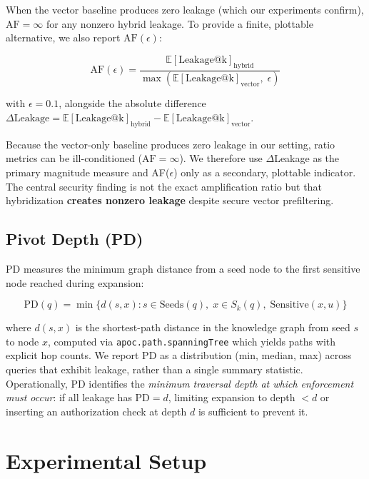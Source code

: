 \documentclass[letterpaper,twocolumn,10pt]{article}
\begin{document}
\noindent When the vector baseline produces zero leakage (which our
experiments confirm), $\text{AF} = \infty$ for any nonzero hybrid
leakage. To provide a finite, plottable alternative, we also report
$\text{AF}(\epsilon)$:

\begin{equation}
\text{AF}(\epsilon) = \frac{\mathbb{E}[\text{Leakage@k}]_{\text{hybrid}}}%
  {\max(\mathbb{E}[\text{Leakage@k}]_{\text{vector}},\; \epsilon)}
\label{eq:af_eps}
\end{equation}

\noindent with $\epsilon = 0.1$, alongside the absolute difference
$\Delta\text{Leakage} = \mathbb{E}[\text{Leakage@k}]_{\text{hybrid}}
- \mathbb{E}[\text{Leakage@k}]_{\text{vector}}$.

\noindent Because the vector-only baseline produces zero leakage in
our setting, ratio metrics can be ill-conditioned ($\text{AF} =
\infty$). We therefore use $\Delta$Leakage as the primary magnitude
measure and AF($\epsilon$) only as a secondary, plottable indicator.
The central security finding is not the exact amplification ratio but
that hybridization \textbf{creates nonzero leakage} despite secure
vector prefiltering.

\subsection{Pivot Depth (PD)}

PD measures the minimum graph distance from a seed node to the first
sensitive node reached during expansion:

\begin{equation}
\text{PD}(q) = \min\{d(s, x) : s \in \text{Seeds}(q),\;
  x \in S_k(q),\; \text{Sensitive}(x, u)\}
\label{eq:pd}
\end{equation}

\noindent where $d(s, x)$ is the shortest-path distance in the
knowledge graph from seed $s$ to node $x$, computed via
\texttt{apoc.path.spanningTree} which yields paths with explicit hop
counts. We report PD as a distribution (min, median, max) across
queries that exhibit leakage, rather than a single summary statistic.
Operationally, PD identifies the \emph{minimum traversal depth at
which enforcement must occur}: if all leakage has $\text{PD} = d$,
limiting expansion to depth $< d$ or inserting an authorization check
at depth $d$ is sufficient to prevent it.

\section{Experimental Setup}
\label{sec:setup}
\end{document}
